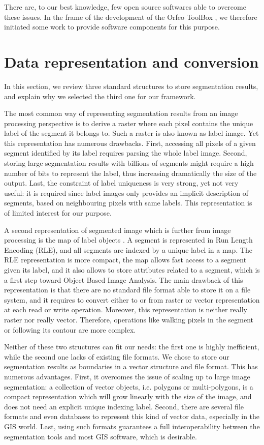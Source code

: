 \documentclass{josis}
\begin{document}
There are, to our best knowledge, few open source softwares able to
overcome these issues. In the frame of the development of the Orfeo
ToolBox \cite{}, we therefore initiated some work to provide software
components for this purpose.

\section{Data representation and conversion}

In this section, we review three standard structures to store
segmentation results, and explain why we selected the third one for
our framework.

The most common way of representing segmentation results from an image
processing perspective is to derive a raster where each pixel contains
the unique label of the segment it belongs to. Such a raster is also
known as label image. Yet this representation has numerous
drawbacks. First, accessing all pixels of a given segment identified
by its label requires parsing the whole label image. Second, storing
large segmentation results with billions of segments might require a
high number of bits to represent the label, thus increasing
dramatically the size of the output. Last, the constraint of label
uniqueness is very strong, yet not very useful: it is required since
label images only provides an implicit description of segments, based
on neighbouring pixels with same labels. This representation is of
limited interest for our purpose.

A second representation of segmented image which is further from image
processing is the map of label objects \cite{lehmann2008label}. A segment is
represented in Run Length Encoding (RLE), and all segments are indexed
by a unique label in a map. The RLE representation is more compact,
the map allows fast access to a segment given its label, and it also
allows to store attributes related to a segment, which is a first step
toward Object Based Image Analysis. The main drawback of this
representation is that there are no standard file format able to store
it on a file system, and it requires to convert either to or from
raster or vector representation at each read or write
operation. Moreover, this representation is neither really raster nor
really vector. Therefore, operations like walking pixels in the
segment or following its contour are more complex.

Neither of these two structures can fit our needs: the first one is
highly inefficient, while the second one lacks of existing file
formats. We chose to store our segmentation results as boundaries in a
vector structure and file format. This has numerous advantages. First,
it overcomes the issue of scaling up to large image segmentation: a
collection of vector objects, i.e. polygons or multi-polygons, is a
compact representation which will grow linearly with the size of the
image, and does not need an explicit unique indexing label. Second,
there are several file formats and even databases to represent this
kind of vector data, especially in the GIS world. Last, using such
formats guarantees a full interoperability between the segmentation
tools and most GIS software, which is desirable.
\end{document}
